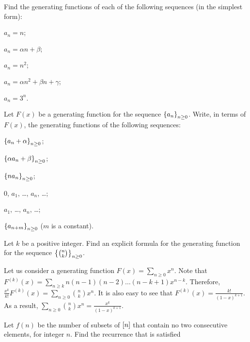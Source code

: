 \begin{chapterendexercises}
  \exercise[recommended] Find the generating functions of each of the following sequences
    (in the simplest form):
    \begin{enumerate}[nolistsep]
      \begin{multicols}{2}
        \item $a_n = n$;
        \item $a_n = \alpha n + \beta$;
        \item $a_n = n^2$;
        \item $a_n = \alpha n^2 + \beta n + \gamma$;
        \item $a_n = 3^n$.
      \end{multicols}
    \end{enumerate}
  \exercise[recommended] Let $F(x)$ be a generating function for the sequence
    $\set{a_n}_{n \ge 0}$. Write, in terms of $F(x)$, the generating functions
    of the following sequences:
    \begin{enumerate}[nolistsep]
      \begin{multicols}{2}
        \item $\set{a_n + \alpha}_{n \ge 0}$;
        \item $\set{\alpha a_n + \beta}_{n \ge 0}$;
        \item $\set{n a_n}_{n \ge 0}$;
        \item $0$, $a_1$, \dots, $a_n$, \dots;
        \item $a_1$, \dots, $a_n$, \dots;
        \item $\set{a_{n + m}}_{n \ge 0}$ ($m$ is a constant).
      \end{multicols}
    \end{enumerate}
  \exercise Let $k$ be a positive integer. Find an explicit formula for the
    generating function for the sequence $\set{\binom{n}{k}}_{n \ge 0}$.
    \begin{solution}
      Let us consider a generating function $F(x) = \sum_{n \ge 0} x^n$. Note that
      $F^{(k)}(x) = \sum_{n \ge k} n (n - 1) (n - 2) \dots (n - k + 1) x^{n - k}$.
      Therefore, $\frac{x^k}{k!} F^{(k)}(x) = \sum_{n \ge 0} \binom{n}{k} x^n$. It
      is also easy to see that $F^{(k)}(x) = \frac{k!}{(1 - x)^{k + 1}}$. As a
      result, $\sum_{n \ge 0} \binom{n}{k} x^n = \frac{x^k}{(1 - x)^{k + 1}}$.
    \end{solution}
  \exercise Let $f(n)$ be the number of subsets of ${[{n}]}$ that contain no two
    consecutive elements, for integer $n$. Find the recurrence that is satisfied

\end{chapterendexercises}

